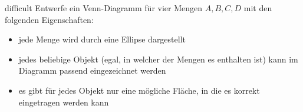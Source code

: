 \documentclass[../abbildungen.tex]{subfiles}
\begin{document}
\begin{exercise}{difficult}
    Entwerfe ein Venn-Diagramm für vier Mengen $A,B,C,D$ mit den folgenden Eigenschaften:
    \begin{itemize}
        \item jede Menge wird durch eine Ellipse dargestellt
        \item jedes beliebige Objekt (egal, in welcher der Mengen es enthalten ist) kann im Diagramm passend eingezeichnet werden
        \item es gibt für jedes Objekt nur eine mögliche Fläche, in die es korrekt eingetragen werden kann
    \end{itemize}
\end{exercise}
\end{document}
